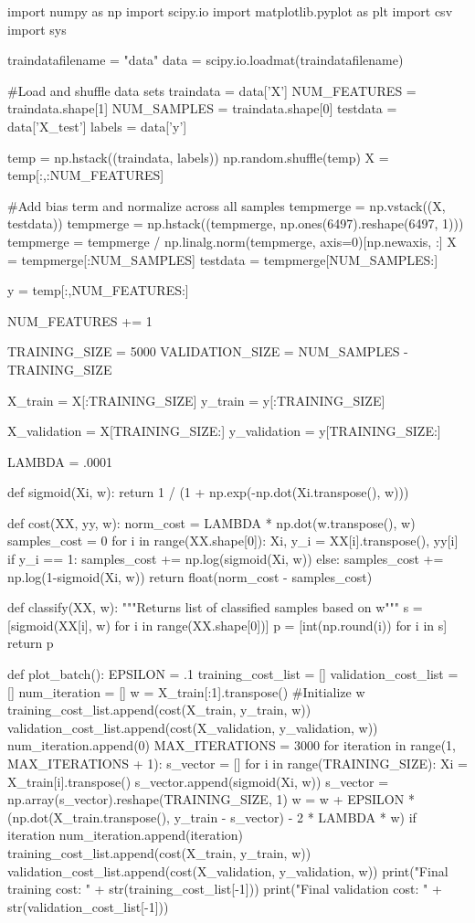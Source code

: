 \documentclass{article}
\begin{document}
\begin{python}    
import numpy as np
import scipy.io
import matplotlib.pyplot as plt
import csv
import sys

traindatafilename = "data"
data = scipy.io.loadmat(traindatafilename)

#Load and shuffle data sets
traindata = data['X']
NUM_FEATURES = traindata.shape[1]
NUM_SAMPLES = traindata.shape[0]
testdata = data['X_test']
labels = data['y']

temp = np.hstack((traindata, labels))
np.random.shuffle(temp)
X = temp[:,:NUM_FEATURES]

#Add bias term and normalize across all samples
tempmerge = np.vstack((X, testdata))
tempmerge = np.hstack((tempmerge, np.ones(6497).reshape(6497, 1)))
tempmerge = tempmerge / np.linalg.norm(tempmerge, axis=0)[np.newaxis, :]
X = tempmerge[:NUM_SAMPLES]
testdata = tempmerge[NUM_SAMPLES:]

y = temp[:,NUM_FEATURES:]

NUM_FEATURES += 1

TRAINING_SIZE = 5000
VALIDATION_SIZE = NUM_SAMPLES - TRAINING_SIZE

X_train = X[:TRAINING_SIZE]
y_train = y[:TRAINING_SIZE]

X_validation = X[TRAINING_SIZE:]
y_validation = y[TRAINING_SIZE:]

LAMBDA = .0001

def sigmoid(Xi, w):
    return 1 / (1 + np.exp(-np.dot(Xi.transpose(), w)))

def cost(XX, yy, w):
    norm_cost = LAMBDA * np.dot(w.transpose(), w)
    samples_cost = 0
    for i in range(XX.shape[0]):
        Xi, y_i = XX[i].transpose(), yy[i]
        if y_i == 1:
            samples_cost += np.log(sigmoid(Xi, w))
        else:
            samples_cost += np.log(1-sigmoid(Xi, w))
    return float(norm_cost - samples_cost)

def classify(XX, w):
    """Returns list of classified samples based on w"""
    s = [sigmoid(XX[i], w) for i in range(XX.shape[0])]
    p = [int(np.round(i)) for i in s]
    return p

def plot_batch():
    EPSILON = .1
    training_cost_list = []
    validation_cost_list = []
    num_iteration = []
    w = X_train[:1].transpose() #Initialize w
    training_cost_list.append(cost(X_train, y_train, w))
    validation_cost_list.append(cost(X_validation, y_validation, w))
    num_iteration.append(0)
    MAX_ITERATIONS = 3000
    for iteration in range(1, MAX_ITERATIONS + 1):
        s_vector = []
        for i in range(TRAINING_SIZE):
            Xi = X_train[i].transpose()
            s_vector.append(sigmoid(Xi, w))
        s_vector = np.array(s_vector).reshape(TRAINING_SIZE, 1)
        w = w + EPSILON * (np.dot(X_train.transpose(), y_train - s_vector)
            - 2 * LAMBDA * w)
        if iteration %
            num_iteration.append(iteration)
            training_cost_list.append(cost(X_train, y_train, w))
            validation_cost_list.append(cost(X_validation, y_validation, w))
    print("Final training cost: " + str(training_cost_list[-1]))
    print("Final validation cost: " + str(validation_cost_list[-1]))


\end{python}
\end{document}
